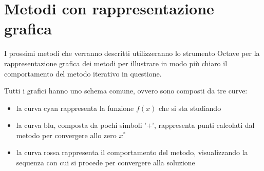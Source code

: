 \section*{Metodi con rappresentazione grafica}
I prossimi metodi che verranno descritti utilizzeranno lo strumento Octave
per la rappresentazione grafica dei metodi per illustrare in modo pi\`u chiaro
il comportamento del metodo iterativo in questione.

Tutti i grafici hanno uno schema comune, ovvero sono composti da tre curve:
\begin{itemize}
  \item la curva cyan rappresenta la funzione $f(x)$ che si sta studiando
  \item la curva blu, composta da pochi simboli '$+$', rappresenta punti
  calcolati dal metodo per convergere allo zero $x^{*}$
  \item la curva rossa rappresenta il comportamento del metodo, visualizzando
  la sequenza con cui si procede per convergere alla soluzione
\end{itemize}



